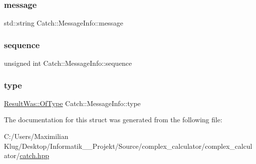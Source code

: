\subsubsection{\texorpdfstring{message}{message}}
{\footnotesize\ttfamily std\+::string Catch\+::\+Message\+Info\+::message}

\mbox{\label{struct_catch_1_1_message_info_a7f4f57ea21e50160adefce7b68a781d6}} 
\subsubsection{\texorpdfstring{sequence}{sequence}}
{\footnotesize\ttfamily unsigned int Catch\+::\+Message\+Info\+::sequence}

\mbox{\label{struct_catch_1_1_message_info_ae928b9117465c696e45951d9d0284e78}} 
\subsubsection{\texorpdfstring{type}{type}}
{\footnotesize\ttfamily \mbox{\hyperlink{struct_catch_1_1_result_was_a624e1ee3661fcf6094ceef1f654601ef}{Result\+Was\+::\+Of\+Type}} Catch\+::\+Message\+Info\+::type}



The documentation for this struct was generated from the following file\+:\begin{DoxyCompactItemize}
\item 
C\+:/\+Users/\+Maximilian Klug/\+Desktop/\+Informatik\+\_\+\_\+\+Projekt/\+Source/complex\+\_\+calculator/complex\+\_\+calculator/\mbox{\hyperlink{catch_8hpp}{catch.\+hpp}}\end{DoxyCompactItemize}
